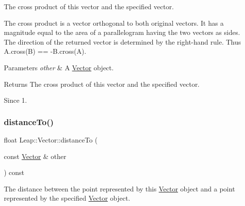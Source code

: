 The cross product of this vector and the specified vector.

The cross product is a vector orthogonal to both original vectors. It has a magnitude equal to the area of a parallelogram having the two vectors as sides. The direction of the returned vector is determined by the right-\/hand rule. Thus {\ttfamily A.\+cross(\+B) == -\/\+B.\+cross(A).}




\begin{DoxyCodeInclude}
\end{DoxyCodeInclude}



\begin{DoxyParams}{Parameters}
{\em other} & A \hyperlink{struct_leap_1_1_vector}{Vector} object. \\
\hline
\end{DoxyParams}
\begin{DoxyReturn}{Returns}
The cross product of this vector and the specified vector. 
\end{DoxyReturn}
\begin{DoxySince}{Since}
1. 
\end{DoxySince}
\mbox{\label{struct_leap_1_1_vector_ae2334e1435f06ce1ffe4019b66bd08a8}} 
\subsubsection{\texorpdfstring{distance\+To()}{distanceTo()}}
{\footnotesize\ttfamily float Leap\+::\+Vector\+::distance\+To (\begin{DoxyParamCaption}\item[{const \hyperlink{struct_leap_1_1_vector}{Vector} \&}]{other }\end{DoxyParamCaption}) const\hspace{0.3cm}{\ttfamily [inline]}}

The distance between the point represented by this \hyperlink{struct_leap_1_1_vector}{Vector} object and a point represented by the specified \hyperlink{struct_leap_1_1_vector}{Vector} object.


\begin{DoxyCodeInclude}
\end{DoxyCodeInclude}



